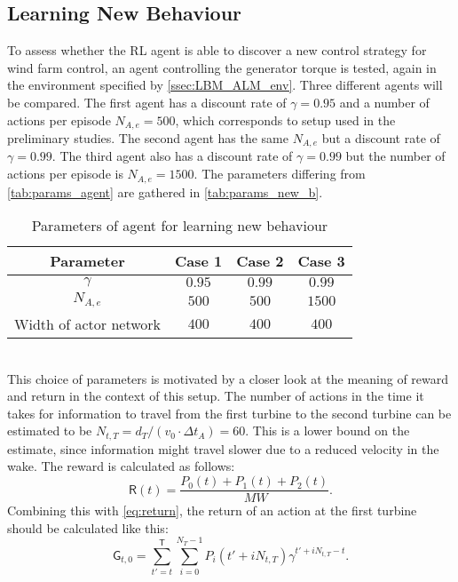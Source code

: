 \subsection{Learning New Behaviour}
\label{ssec:new_behaviour_description}
To assess whether the RL agent is able to discover a new control strategy for wind farm control, an agent controlling the generator torque is tested, again in the environment specified by \autoref{ssec:LBM_ALM_env}. Three different agents will be compared. The first agent has a discount rate of $\gamma = 0.95$ and a number of actions per episode $N_{A,e} = 500$, which corresponds to setup used in the preliminary studies. The second agent has the same $N_{A,e}$ but a discount rate of $\gamma = 0.99$. The third agent also has a discount rate of $\gamma = 0.99$ but the number of actions per episode is $N_{A,e} = 1500$. The parameters differing from \autoref{tab:params_agent} are gathered in \autoref{tab:params_new_b}. 
\begin{table}[h]
	\centering
	\caption{Parameters of agent for learning new behaviour}
	\begin{tabular}{cccc}
		\toprule 
		Parameter & Case 1 & Case 2 & Case 3 \\ 
		\midrule
		$\gamma$ & $0.95$ & $0.99$ & $0.99$ \\ 
		$N_{A,e}$ & $500$ & $500$ & $1500$ \\ 
		Width of actor network & $400$ & $400$ & $400$ \\
		\bottomrule
	\end{tabular}
	\label{tab:params_new_b}
\end{table}\\
This choice of parameters is motivated by a closer look at the meaning of reward and return in the context of this setup. The number of actions in the time it takes for information to travel from the first turbine to the second turbine can be estimated to be $N_{t,T} = d_T/(v_0 \cdot \Delta t_A) = 60$. This is a lower bound on the estimate, since information might travel slower due to a reduced velocity in the wake. The reward is calculated as follows: 
\begin{equation} 
\mathsf{R}(t) = \frac{P_0(t) + P_1(t) + P_2(t)}{\SI{}{MW}}.
\end{equation} Combining this with \eqref{eq:return}, the return of an action at the first turbine should be calculated like this:
\begin{equation}
	\mathsf{G}_{t,0} = \sum^\mathsf{T}_{t'=t} \sum_{i=0}^{N_T-1}P_i(t'+iN_{t,T})\gamma^{t'+iN_{t,T}-t}.
\end{equation}
